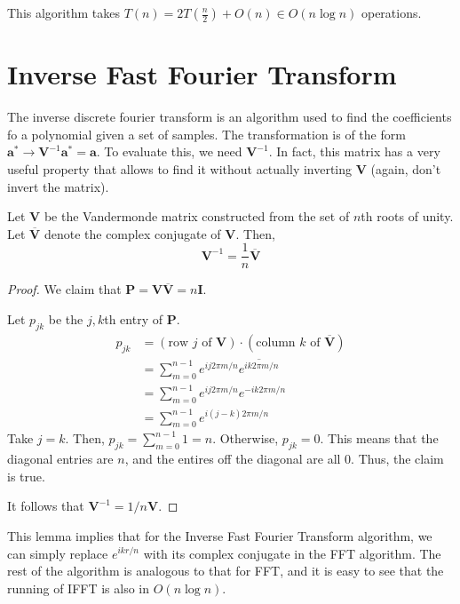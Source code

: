 This algorithm takes $T(n) = 2T\left( \frac{n}{2} \right) + O(n) \in O(n \log n)$ operations.

\section{Inverse Fast Fourier Transform}

The inverse discrete fourier transform is an algorithm used to find the coefficients fo a polynomial given a set of samples. The transformation is of the form $\mathbf{a}^* \to \mathbf{V}^{-1}\mathbf{a}^* = \mathbf{a}$. To evaluate this, we need $\mathbf{V}^{-1}$. In fact, this matrix has a very useful property that allows to find it without actually inverting $\mathbf{V}$ (again, don't invert the matrix).

\begin{lemma}
    Let $\mathbf{V}$ be the Vandermonde matrix constructed from the set of $n$th roots of unity. Let $\overline{\mathbf{V}}$ denote the complex conjugate of $\mathbf{V}$. Then,
    $$
    \mathbf{V}^{-1} = \frac{1}{n}\overline{\mathbf{V}}
    $$
\end{lemma}

\begin{proof}
    We claim that $\mathbf{P} = \mathbf{V}\overline{\mathbf{V}} = n \mathbf{I}$.

    Let $p_{jk}$ be the $j,k$th entry of $\mathbf{P}$.
    $$
    \begin{aligned}
        p_{jk} &= (\text{row $j$ of $\mathbf{V}$}) \cdot (\text{column $k$ of $\overline{\mathbf{V}}$}) \\
        &= \sum_{m=0}^{n-1} e^{ij2\pi m/n} \overline{e^{ik2\pi m/n}} \\
        &= \sum_{m=0}^{n-1} e^{ij2\pi m/n} e^{-ik2\pi m/n} \\
        &= \sum_{m=0}^{n-1} e^{i(j-k)2\pi m/n}
    \end{aligned}
    $$
    Take $j=k$. Then, $p_{jk} = \sum_{m=0}^{n-1} 1 = n$. Otherwise, $p_{jk} = 0$. This means that the diagonal entries are $n$, and the entires off the diagonal are all 0. Thus, the claim is true.

    It follows that $\mathbf{V}^{-1} = 1/n \mathbf{V}$.
\end{proof}

This lemma implies that for the Inverse Fast Fourier Transform algorithm, we can simply replace $e^{ikr/n}$ with its complex conjugate in the FFT algorithm. The rest of the algorithm is analogous to that for FFT, and it is easy to see that the running of IFFT is also in $O(n \log n)$.

